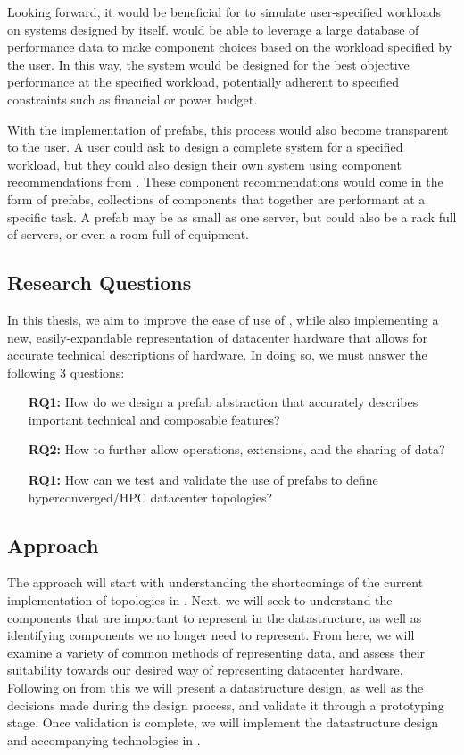 \documentclass[11pt]{article}
\begin{document}
		Looking forward, it would be beneficial for \opendc{} to simulate user-specified workloads on systems designed by \opendc{} itself. 
		\opendc{} would be able to leverage a large database of performance data to make component choices based on the workload specified by the user. 
		In this way, the system would be designed for the best objective performance at the specified workload, potentially adherent to specified constraints such as financial or power budget. 

		With the implementation of prefabs, this process would also become transparent to the user. 
		A user could ask \opendc{} to design a complete system for a specified workload, but they could also design their own system using component recommendations from \opendc{}. 
		These component recommendations would come in the form of prefabs, collections of components that together are performant at a specific task. 
		A prefab may be as small as one server, but could also be a rack full of servers, or even a room full of equipment. 
	\subsection{Research Questions}
		In this thesis, we aim to improve the ease of use of \opendc{}, while also implementing a new, easily-expandable representation of datacenter hardware that allows for accurate technical descriptions of hardware. 
		In doing so, we must answer the following 3 questions:
		\begin{itemize}
			\item [\textbf{RQ1:}] How do we design a prefab abstraction that accurately describes important technical and composable features?
			\item [\textbf{RQ2:}] How to further allow operations, extensions, and the sharing of data?
			\item [\textbf{RQ1:}] How can we test and validate the use of prefabs to define hyperconverged/HPC datacenter topologies?
		\end{itemize}
	\subsection{Approach}
		The approach will start with understanding the shortcomings of the current implementation of topologies in \opendc{}.
		Next, we will seek to understand the components that are important to represent in the datastructure, as well as identifying components we no longer need to represent.
		From here, we will examine a variety of common methods of representing data, and assess their suitability towards our desired way of representing datacenter hardware.
		Following on from this we will present a datastructure design, as well as the decisions made during the design process, and validate it through a prototyping stage.
		Once validation is complete, we will implement the datastructure design and accompanying technologies in \opendc{}.
\end{document}
